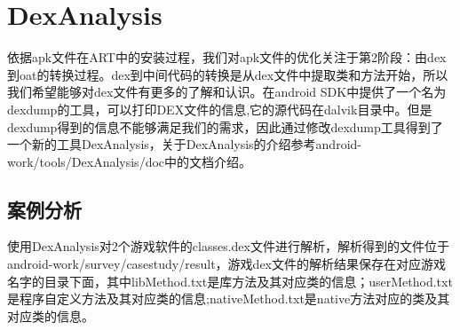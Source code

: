 \section{DexAnalysis}
依据apk文件在ART中的安装过程，我们对apk文件的优化关注于第2阶段：由dex到oat的转换过程。dex到中间代码的转换是从dex文件中提取类和方法开始，所以我们希望能够对dex文件有更多的了解和认识。在android SDK中提供了一个名为dexdump的工具，可以打印DEX文件的信息,它的源代码在dalvik目录中。但是dexdump得到的信息不能够满足我们的需求，因此通过修改dexdump工具得到了一个新的工具DexAnalysis，关于DexAnalysis的介绍参考android-work/tools/DexAnalysis/doc中的文档介绍。
\subsection{案例分析}
使用DexAnalysis对2个游戏软件的classes.dex文件进行解析，解析得到的文件位于android-work/survey/casestudy/result，游戏dex文件的解析结果保存在对应游戏名字的目录下面，其中libMethod.txt是库方法及其对应类的信息；userMethod.txt是程序自定义方法及其对应类的信息;nativeMethod.txt是native方法对应的类及其对应类的信息。


